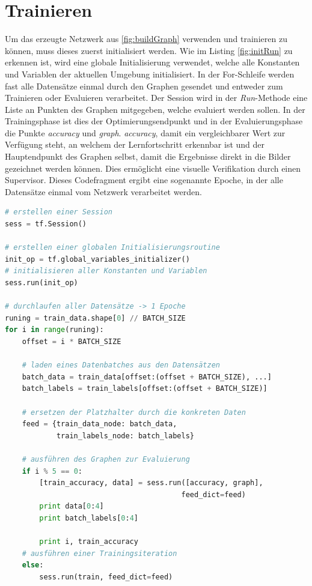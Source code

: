 \section{Trainieren}

Um das erzeugte Netzwerk aus \ref{fig:buildGraph} verwenden und trainieren zu können, muss dieses zuerst initialisiert werden. 
Wie im Listing \ref{fig:initRun} zu erkennen ist, wird eine globale Initialisierung verwendet, welche alle Konstanten und Variablen der aktuellen Umgebung initialisiert. 
In der For-Schleife werden fast alle Datensätze einmal durch den Graphen gesendet und entweder zum Trainieren oder Evaluieren verarbeitet. 
Der Session wird in der \textit{Run}-Methode eine Liste an Punkten des Graphen mitgegeben, welche evaluiert werden sollen. 
In der Trainingsphase ist dies der Optimierungsendpunkt und in der Evaluierungsphase die Punkte \textit{accuracy} und \textit{graph}. 
\textit{accuracy}, damit ein vergleichbarer Wert zur Verfügung steht, an welchem der Lernfortschritt erkennbar ist und der Hauptendpunkt des Graphen selbst, damit die Ergebnisse direkt in die Bilder gezeichnet werden können. 
Dies ermöglicht eine visuelle Verifikation durch einen Supervisor. 
Dieses Codefragment ergibt eine sogenannte Epoche, in der alle Datensätze einmal vom Netzwerk verarbeitet werden. 
\begin{lstlisting}[caption={Initialisierung des Graphen und Durchführen einer Epoche},label=fig:initRun,captionpos=b,language=Python]
# erstellen einer Session
sess = tf.Session()

# erstellen einer globalen Initialisierungsroutine
init_op = tf.global_variables_initializer()
# initialisieren aller Konstanten und Variablen
sess.run(init_op)

# durchlaufen aller Datensätze -> 1 Epoche
runing = train_data.shape[0] // BATCH_SIZE
for i in range(runing):
    offset = i * BATCH_SIZE
    
    # laden eines Datenbatches aus den Datensätzen
    batch_data = train_data[offset:(offset + BATCH_SIZE), ...]
    batch_labels = train_labels[offset:(offset + BATCH_SIZE)]
    
    # ersetzen der Platzhalter durch die konkreten Daten
    feed = {train_data_node: batch_data, 
            train_labels_node: batch_labels}
     
    # ausführen des Graphen zur Evaluierung
    if i % 5 == 0:
        [train_accuracy, data] = sess.run([accuracy, graph], 
        								 feed_dict=feed)
        print data[0:4]
        print batch_labels[0:4]
        
        print i, train_accuracy
    # ausführen einer Trainingsiteration
    else:
        sess.run(train, feed_dict=feed)
\end{lstlisting}

